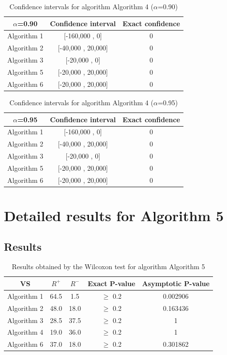 \documentclass[a4paper,10pt]{article}
\begin{document}
\begin{table}[!htp]
\centering\small
\begin{tabular}{
|c|c|c|}
\hline
 $\alpha$=0.90 & Confidence interval & Exact confidence \\ \hline 
Algorithm 1 & [-160,000 , 0] & 0\\ \hline 
Algorithm 2 & [-40,000 , 20,000] & 0\\ \hline 
Algorithm 3 & [-20,000 , 0] & 0\\ \hline 
Algorithm 5 & [-20,000 , 20,000] & 0\\ \hline 
Algorithm 6 & [-20,000 , 20,000] & 0\\ \hline 

\end{tabular}
\caption{Confidence intervals for algorithm Algorithm 4 ($\alpha$=0.90)}
\end{table}
\begin{table}[!htp]
\centering\small
\begin{tabular}{
|c|c|c|}
\hline
 $\alpha$=0.95 & Confidence interval & Exact confidence \\ \hline 
Algorithm 1 & [-160,000 , 0] & 0\\ \hline 
Algorithm 2 & [-40,000 , 20,000] & 0\\ \hline 
Algorithm 3 & [-20,000 , 0] & 0\\ \hline 
Algorithm 5 & [-20,000 , 20,000] & 0\\ \hline 
Algorithm 6 & [-20,000 , 20,000] & 0\\ \hline 

\end{tabular}
\caption{Confidence intervals for algorithm Algorithm 4 ($\alpha$=0.95)}
\end{table}

 \clearpage 


\section{Detailed results for Algorithm 5}


\subsection{Results}

\begin{table}[!htp]
\centering\small
\begin{tabular}{
|c|c|c|c|c|}
\hline
 VS & $R^{+}$ & $R^{-}$ & Exact P-value & Asymptotic P-value \\ \hline 
Algorithm 1 & 64.5 & 1.5 & $\geq$ 0.2 & 0.002906\\ \hline 
Algorithm 2 & 48.0 & 18.0 & $\geq$ 0.2 & 0.163436\\ \hline 
Algorithm 3 & 28.5 & 37.5 & $\geq$ 0.2 & 1\\ \hline 
Algorithm 4 & 19.0 & 36.0 & $\geq$ 0.2 & 1\\ \hline 
Algorithm 6 & 37.0 & 18.0 & $\geq$ 0.2 & 0.301862\\ \hline 

\end{tabular}
\caption{Results obtained by the Wilcoxon test for algorithm Algorithm 5}
\end{table}
\end{document}
